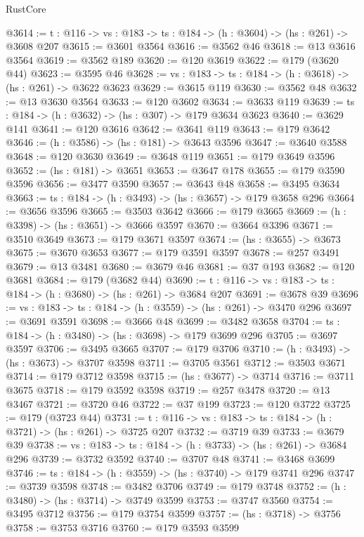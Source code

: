 \begin{lexlean}{RustCore}
\begin{coremodule}
@3614 := {t : @116} -> {vs : @183} -> {ts : @184} -> (h : @3604) -> (hs : @261) -> @3608 @207
@3615 := @3601 @3564
@3616 := @3562 @46
@3618 := @13 @3616 @3564
@3619 := @3562 @189
@3620 := @120 @3619
@3622 := @179 (@3620 @44)
@3623 := @3595 @46
@3628 := {vs : @183} -> {ts : @184} -> (h : @3618) -> (hs : @261) -> @3622 @3623
@3629 := @3615 @119
@3630 := @3562 @48
@3632 := @13 @3630 @3564
@3633 := @120 @3602
@3634 := @3633 @119
@3639 := {ts : @184} -> (h : @3632) -> (hs : @307) -> @179 @3634 @3623
@3640 := @3629 @141
@3641 := @120 @3616
@3642 := @3641 @119
@3643 := @179 @3642
@3646 := (h : @3586) -> (hs : @181) -> @3643 @3596
@3647 := @3640 @3588
@3648 := @120 @3630
@3649 := @3648 @119
@3651 := @179 @3649 @3596
@3652 := (hs : @181) -> @3651
@3653 := @3647 @178
@3655 := @179 @3590 @3596
@3656 := @3477 @3590
@3657 := @3643 @48
@3658 := @3495 @3634
@3663 := {ts : @184} -> (h : @3493) -> (hs : @3657) -> @179 @3658 @296
@3664 := @3656 @3596
@3665 := @3503 @3642
@3666 := @179 @3665
@3669 := (h : @3398) -> (hs : @3651) -> @3666 @3597
@3670 := @3664 @3396
@3671 := @3510 @3649
@3673 := @179 @3671 @3597
@3674 := (hs : @3655) -> @3673
@3675 := @3670 @3653
@3677 := @179 @3591 @3597
@3678 := @257 @3491
@3679 := @13 @3481
@3680 := @3679 @46
@3681 := @37 @193
@3682 := @120 @3681
@3684 := @179 (@3682 @44)
@3690 := {t : @116} -> {vs : @183} -> {ts : @184} -> (h : @3680) -> (hs : @261) -> @3684 @207
@3691 := @3678 @39
@3696 := {vs : @183} -> {ts : @184} -> (h : @3559) -> (hs : @261) -> @3470 @296
@3697 := @3691 @3591
@3698 := @3666 @48
@3699 := @3482 @3658
@3704 := {ts : @184} -> (h : @3480) -> (hs : @3698) -> @179 @3699 @296
@3705 := @3697 @3597
@3706 := @3495 @3665
@3707 := @179 @3706
@3710 := (h : @3493) -> (hs : @3673) -> @3707 @3598
@3711 := @3705 @3561
@3712 := @3503 @3671
@3714 := @179 @3712 @3598
@3715 := (hs : @3677) -> @3714
@3716 := @3711 @3675
@3718 := @179 @3592 @3598
@3719 := @257 @3478
@3720 := @13 @3467
@3721 := @3720 @46
@3722 := @37 @199
@3723 := @120 @3722
@3725 := @179 (@3723 @44)
@3731 := {t : @116} -> {vs : @183} -> {ts : @184} -> (h : @3721) -> (hs : @261) -> @3725 @207
@3732 := @3719 @39
@3733 := @3679 @39
@3738 := {vs : @183} -> {ts : @184} -> (h : @3733) -> (hs : @261) -> @3684 @296
@3739 := @3732 @3592
@3740 := @3707 @48
@3741 := @3468 @3699
@3746 := {ts : @184} -> (h : @3559) -> (hs : @3740) -> @179 @3741 @296
@3747 := @3739 @3598
@3748 := @3482 @3706
@3749 := @179 @3748
@3752 := (h : @3480) -> (hs : @3714) -> @3749 @3599
@3753 := @3747 @3560
@3754 := @3495 @3712
@3756 := @179 @3754 @3599
@3757 := (hs : @3718) -> @3756
@3758 := @3753 @3716
@3760 := @179 @3593 @3599

\end{coremodule}
\end{lexlean}

